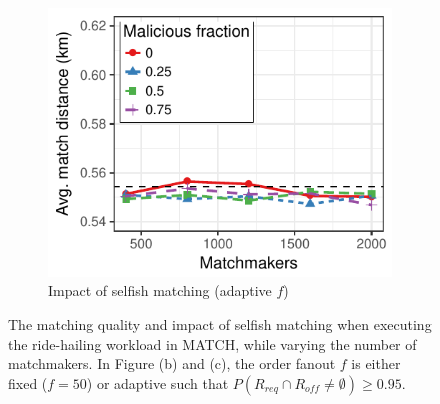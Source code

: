 \begin{figure}[t]
	\begin{subfigure}{.5\columnwidth}
		\centering
		\includegraphics[width=\columnwidth]{match/assets/plots/taxi_fairness_adaptive.pdf}
		\caption{Impact of selfish matching (adaptive $ f $)}
		\label{fig:taxi_fairness_adaptive}
	\end{subfigure}
	\caption{The matching quality and impact of selfish matching when executing the ride-hailing workload in MATCH, while varying the number of matchmakers. In Figure (b) and (c), the order fanout $ f $ is either fixed  ($ f = 50 $) or adaptive such that $ P(R_{req} \cap R_{off} \neq \emptyset) \geq 0.95 $.}
	\label{fig:taxi_experiments}
\end{figure}

